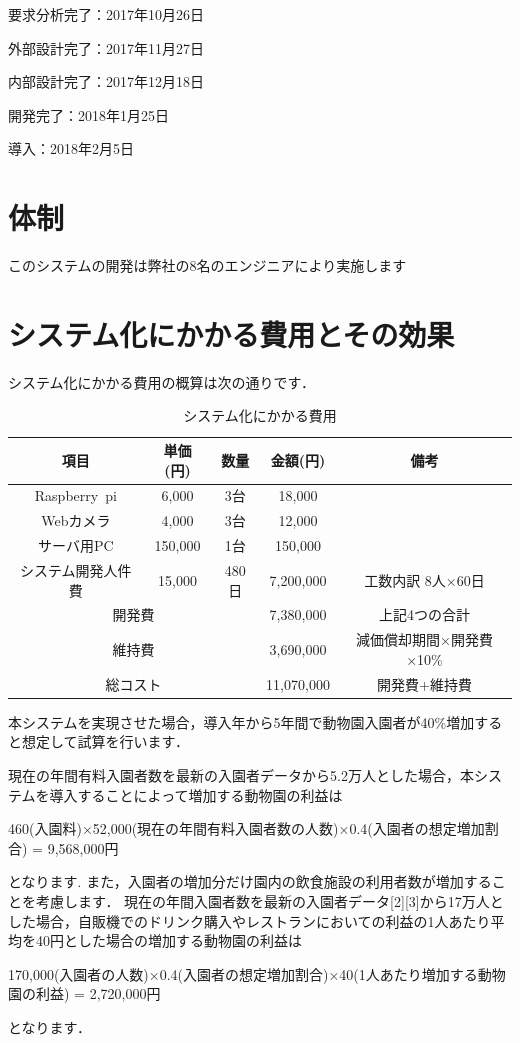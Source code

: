 \documentclass[a4j]{jarticle}
\begin{document}
要求分析完了：2017年10月26日

外部設計完了：2017年11月27日

内部設計完了：2017年12月18日

開発完了：2018年1月25日

導入：2018年2月5日

\section{体制}
このシステムの開発は弊社の8名のエンジニアにより実施します


\section{システム化にかかる費用とその効果}
システム化にかかる費用の概算は次の通りです．
\begin{table}[H]
  \caption{システム化にかかる費用}
  \begin{center}
    \begin{tabular}{|c|c|c|c|c|} \hline
      項目&単価(円)&数量&金額(円)&備考 \\ \hline
      Raspberry~pi&6,000&3台&18,000&　\\ \hline
      Webカメラ&4,000&3台&12,000&　\\ \hline
      サーバ用PC&150,000&1台&150,000&　\\ \hline
      システム開発人件費&15,000&480日&7,200,000&工数内訳 8人×60日 \\ \hline
      \multicolumn{3}{|c|}{開発費}&7,380,000&上記4つの合計 \\ \hline
      \multicolumn{3}{|c|}{維持費}&3,690,000&減価償却期間×開発費×10\% \\ \hline %
      \multicolumn{3}{|c|}{総コスト}&11,070,000&開発費+維持費 \\ \hline
    \end{tabular}
  \end{center}
\end{table}
本システムを実現させた場合，導入年から5年間で動物園入園者が40\%増加すると想定して試算を行います．

現在の年間有料入園者数を最新の入園者データから5.2万人とした場合，本システムを導入することによって増加する動物園の利益は
\begin{screen}
  \begin{center}
    460(入園料)×52,000(現在の年間有料入園者数の人数)×0.4(入園者の想定増加割合) = 9,568,000円
  \end{center}
\end{screen}
となります.
また，入園者の増加分だけ園内の飲食施設の利用者数が増加することを考慮します．
現在の年間入園者数を最新の入園者データ[2][3]から17万人とした場合，自販機でのドリンク購入やレストランにおいての利益の1人あたり平均を40円とした場合の増加する動物園の利益は
\begin{screen}
170,000(入園者の人数)×0.4(入園者の想定増加割合)×40(1人あたり増加する動物園の利益) = 2,720,000円
\end{screen}
となります．
\end{document}
